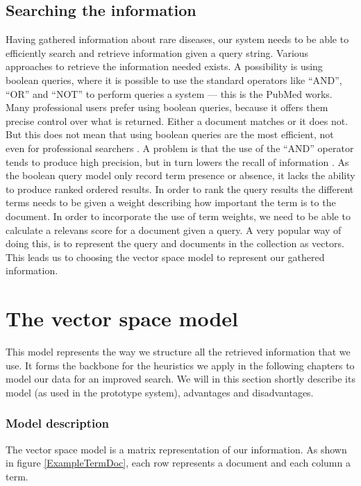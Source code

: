 \subsection{Searching the information}
Having gathered information about rare diseases, our system needs to
be able to efficiently search and retrieve information given a query
string. Various approaches to retrieve the information needed
exists. A possibility is using boolean queries, where it is possible
to use the standard operators like ``AND'', ``OR'' and ``NOT'' to
perform queries a system --- this is the PubMed works. Many
professional users prefer using boolean queries, because it offers
them precise control over what is returned. Either a document matches
or it does not. But this does not mean that using boolean queries are
the most efficient, not even for professional searchers
\cite{IntroIR2009}. A problem is that the use of the ``AND'' operator
tends to produce high precision, but in turn lowers the recall of
information \cite{IntroIR2009}. As the boolean query model only record
term presence or absence, it lacks the ability to produce ranked
ordered results. In order to rank the query results the different
terms needs to be given a weight describing how important the term is
to the document. In order to incorporate the use of term weights, we
need to be able to calculate a relevans score for a document given a
query. A very popular way of doing this, is to represent the query and
documents in the collection as vectors. This leads us to choosing the
vector space model to represent our gathered information.

\section{The vector space model\label{VectorSpace}}

This model represents the way we structure all the retrieved
information that we use. It forms the backbone for the heuristics we
apply in the following chapters to model our data for an improved
search. We will in this section shortly describe its model (as used in
the prototype system), advantages and disadvantages.

\subsubsection{Model description}
The vector space model is a matrix representation of our
information. As shown in figure \ref{ExampleTermDoc}, each row represents a
document and each column a term.

